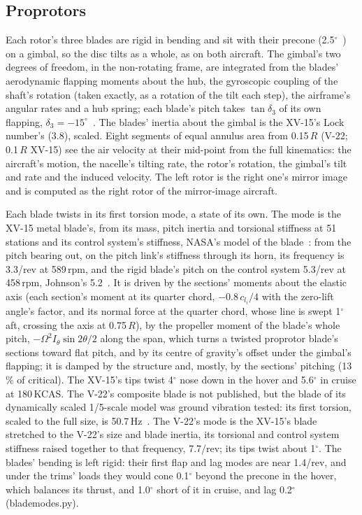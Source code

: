 \documentclass[10pt,a4paper,twocolumn]{article}
\begin{document}
\subsection{Proprotors}
Each rotor's three blades are rigid in bending and sit with their precone (2.5$^\circ$~\cite{ac,fb}) on a gimbal, so the disc tilts as a whole, as on
both aircraft. The gimbal's two degrees of freedom, in the non-rotating frame, are integrated from the blades' aerodynamic flapping
moments about the hub, the gyroscopic coupling of the shaft's rotation (taken exactly, as a rotation of the tilt each step), the
airframe's angular rates and a hub spring; each blade's pitch takes $\tan\delta_3$ of its own flapping, $\delta_3=-15^\circ$~\cite{cr,wj}.
The blades' inertia about the gimbal is the XV-15's Lock number's (3.8), scaled. Eight segments of equal annulus area from 0.15\,$R$ (V-22;
0.1\,$R$ XV-15) see the air velocity at their mid-point from the full kinematics: the aircraft's motion, the nacelle's tilting rate,
the rotor's rotation, the gimbal's tilt and rate and the induced velocity. The left rotor is the right one's mirror image and is
computed as the right rotor of the mirror-image aircraft.

Each blade twists in its first torsion mode, a state of its own. The mode is the XV-15 metal blade's, from its mass, pitch inertia and
torsional stiffness at 51 stations and its control system's stiffness, NASA's model of the blade~\cite{tp}: from the pitch bearing out, on
the pitch link's stiffness through its horn, its frequency is 3.3/rev at 589\,rpm, and the rigid blade's pitch on the control system
5.3/rev at 458\,rpm, Johnson's 5.2~\cite{tx73213}. It is driven by the sections' moments about the elastic axis (each section's moment at
its quarter chord, $-0.8\,c_{l_i}/4$ with the zero-lift angle's factor, and its normal force at the quarter chord, whose line is swept
1$^\circ$ aft, crossing the axis at 0.75\,$R$), by the propeller moment of the blade's whole pitch, $-\Omega^2 I_\theta \sin 2\theta/2$ along the span, which turns a
twisted proprotor blade's sections toward flat pitch, and by its centre of gravity's offset under the gimbal's flapping; it is damped by the
structure and, mostly, by the sections' pitching (13\,\% of critical). The XV-15's tips twist 4$^\circ$ nose down in the hover and
5.6$^\circ$ in cruise at 180\,KCAS. The
V-22's composite blade is not published, but the blade of its dynamically scaled 1/5-scale model was ground vibration tested: its first
torsion, scaled to the full size, is 50.7\,Hz~\cite{wrats}. The V-22's mode is the XV-15's blade stretched to the V-22's size and blade
inertia, its torsional and control system stiffness raised together to that frequency, 7.7/rev; its tips twist about 1$^\circ$. The
blades' bending is left rigid: their first flap and lag modes are near 1.4/rev, and under the trims' loads they would cone 0.1$^\circ$
beyond the precone in the hover, which balances its thrust, and 1.0$^\circ$ short of it in cruise, and lag 0.2$^\circ$ (blademodes.py).
\end{document}
